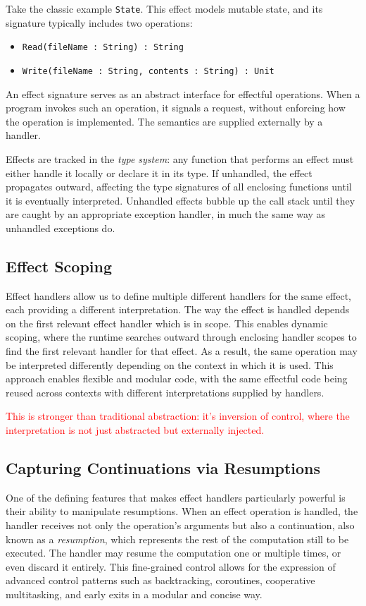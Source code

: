 \documentclass[logo,bsc,singlespacing,parskip]{infthesis}
\begin{document}
Take the classic example \texttt{State}. This effect models mutable state, and its signature typically includes two operations:
\begin{itemize}
    \item \texttt{Read(fileName : String) : String}
    \item \texttt{Write(fileName : String, contents : String) : Unit}
\end{itemize}



An effect signature serves as an abstract interface for effectful operations. When a program invokes such an operation, it signals a request, without enforcing how the operation is implemented. The semantics are supplied externally by a handler.

Effects are tracked in the \textit{type system}: any function that performs an effect must either handle it locally or declare it in its type. If unhandled, the effect propagates outward, affecting the type signatures of all enclosing functions until it is eventually interpreted. Unhandled effects bubble up the call stack until they are caught by an appropriate exception handler, in much the same way as unhandled exceptions do.

\subsection{Effect Scoping}
Effect handlers allow us to define multiple different handlers for the same effect, each providing a different interpretation. The way the effect is handled depends on the first relevant effect handler which is in scope. This enables dynamic scoping, where the runtime searches outward through enclosing handler scopes to find the first relevant handler for that effect. As a result, the same operation may be interpreted differently depending on the context in which it is used. This approach enables flexible and modular code, with the same effectful code being reused across contexts with different interpretations supplied by handlers.

\textcolor{red}{This is stronger than traditional abstraction: it's inversion of control, where the interpretation is not just abstracted but externally injected.}

\subsection{Capturing Continuations via Resumptions}
One of the defining features that makes effect handlers particularly powerful is their ability to manipulate resumptions. When an effect operation is handled, the handler receives not only the operation’s arguments but also a continuation, also known as a \textit{resumption}, which represents the rest of the computation still to be executed. The handler may resume the computation one or multiple times, or even discard it entirely. This fine-grained control allows for the expression of advanced control patterns such as backtracking, coroutines, cooperative multitasking, and early exits in a modular and concise way.
\end{document}
